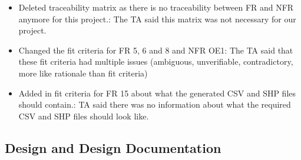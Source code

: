 \documentclass{article}
\begin{document}
\begin{itemize}
    \item Deleted traceability matrix as there is no traceability between FR and NFR anymore for this project.: The TA said this matrix was not necessary for our project.
    \item Changed the fit criteria for FR 5, 6 and 8 and NFR OE1: The TA said that these fit criteria had multiple issues (ambiguous, unverifiable, contradictory, more like rationale than fit criteria)
    \item Added in fit criteria for FR 15 about what the generated CSV and SHP files should contain.: TA said there was no information about what the required CSV and SHP files should look like.
    
\end{itemize}
\subsection{Design and Design Documentation}
\end{document}
